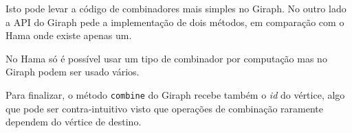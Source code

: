 Isto pode levar a código de combinadores mais simples no Giraph. No outro lado a API do Giraph pede a implementação de dois métodos, em comparação com o Hama onde existe apenas um.

No Hama só é possível usar um tipo de combinador por computação mas no Giraph podem ser usado vários.

Para finalizar, o método \texttt{combine} do Giraph recebe também o \textit{id} do vértice, algo que pode ser contra-intuitivo visto que operações de combinação raramente dependem do vértice de destino.
